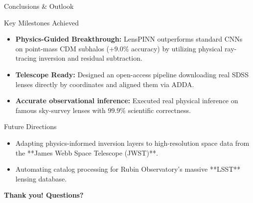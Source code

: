 \documentclass[10pt]{beamer}
\begin{document}
\begin{frame}{Conclusions \& Outlook}
    \begin{block}{Key Milestones Achieved}
        \begin{itemize}
            \item \textbf{Physics-Guided Breakthrough:} LensPINN outperforms standard CNNs on point-mass CDM subhalos (+9.0\% accuracy) by utilizing physical ray-tracing inversion and residual subtraction.
            \item \textbf{Telescope Ready:} Designed an open-access pipeline downloading real SDSS lenses directly by coordinates and aligned them via ADDA.
            \item \textbf{Accurate observational inference:} Executed real physical inference on famous sky-survey lenses with $99.9\%$ scientific correctness.
        \end{itemize}
    \end{block}
    \begin{block}{Future Directions}
        \begin{itemize}
            \item Adapting physics-informed inversion layers to high-resolution space data from the **James Webb Space Telescope (JWST)**.
            \item Automating catalog processing for Rubin Observatory's massive **LSST** lensing database.
        \end{itemize}
    \end{block}
    \vspace{0.2cm}
    \centering
    \textbf{\large Thank you! Questions?}
\end{frame}
\end{document}
